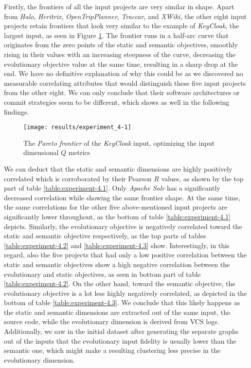 \documentclass[12pt,a4paper]{report}
\begin{document}
Firstly, the frontiers of all the input projects are very similar in shape.
Apart from \textit{Halo}, \textit{Heritrix}, \textit{OpenTripPlanner},
\textit{Traccar}, and \textit{XWiki}, the other eight input projects retain
frontiers that look very similar to the example of \textit{KeyCloak},
the largest input, as seen in Figure \ref{fig:experiment-4.1}.
The frontier runs in a half\hyp arc curve that originates from the zero points
of the static and semantic objectives, smoothly rising in their values with
an increasing steepness of the curve, decreasing the evolutionary objective
value at the same time, resulting in a sharp drop at the end.
We have no definitive explanation of why this could be as we discovered no
measurable correlating attributes that would distinguish these five
input projects from the other eight. We can only conclude that their
software architectures or commit strategies seem to be different,
which shows as well in the following findings.

\begin{figure}[htbp]
\centering
\texttt{[image: results/experiment\_4-1]}
\caption{The \textit{Pareto frontier} of the \textit{KeyCloak} input, optimizing the input dimensional $Q$ metrics}
\label{fig:experiment-4.1}
\end{figure}

We can deduct that the static and semantic dimensions are highly positively
correlated which is corroborated by their Pearson $R$ values, as shown by
the top part of table \ref{table:experiment-4.1}.
Only \textit{Apache Solr} has a significantly decreased correlation
while showing the same frontier shape.
At the same time, the same correlations for the other five above\hyp mentioned
input projects are significantly lower throughout, as the bottom of table
\ref{table:experiment-4.1} depicts.
Similarly, the evolutionary objective is negatively correlated toward the static
and semantic objective respectively, as the top parts of tables
\ref{table:experiment-4.2} and \ref{table:experiment-4.3} show.
Interestingly, in this regard, also the five projects that had only a low
positive correlation between the static and semantic objectives show a high
negative correlation between the evolutionary and static objectives,
as seen in bottom part of table \ref{table:experiment-4.2}.
On the other hand, toward the semantic objective, the evolutionary objective
is a lot less highly negatively correlated, as depicted in the bottom of table
\ref{table:experiment-4.3}.
We conclude that this likely happens as the static and semantic dimensions are
extracted out of the same input, the source code, while the evolutionary
dimension is derived from VCS logs. Additionally, we saw in the initial dataset
after generating the separate graphs out of the inputs that the evolutionary
input fidelity is usually lower than the semantic one, which might make a
resulting clustering less precise in the evolutionary dimension.
\end{document}
